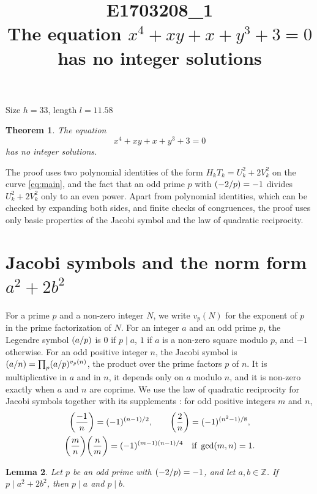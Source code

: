 \documentclass[11pt]{article}
\title{\textbf{E1703208\_1}\\[4pt] {\Large The equation $x^{4}+xy+x+y^{3}+3=0$ has no integer solutions}}
\author{}
\date{}
\newtheorem{theorem}{Theorem}
\newtheorem{lemma}[theorem]{Lemma}
\newcommand{\Z}{\mathbb{Z}}
\newcommand{\leg}[2]{\mathchoice{\biggl(\dfrac{#1}{#2}\biggr)}{(#1/#2)}{(#1/#2)}{(#1/#2)}}
\begin{document}
\maketitle
\vspace{-8ex}
\begin{center}
Size $h=33$, length $l=11.58$
\end{center}

\begin{theorem}\label{thm:main}
The equation
\begin{equation}\label{eq:main}
x^{4}+xy+x+y^{3}+3=0
\end{equation}
has no integer solutions.
\end{theorem}

The proof uses two polynomial identities of the form $H_kT_k=U_k^2+2V_k^2$ on the curve \eqref{eq:main}, and the fact that an odd prime $p$ with $\leg{-2}{p}=-1$ divides $U_k^2+2V_k^2$ only to an even power. Apart from polynomial identities, which can be checked by expanding both sides, and finite checks of congruences, the proof uses only basic properties of the Jacobi symbol and the law of quadratic reciprocity.

\section{\texorpdfstring{Jacobi symbols and the norm form $a^2+2b^2$}{Jacobi symbols and the norm form}}

For a prime $p$ and a non-zero integer $N$, we write $v_p(N)$ for the exponent of $p$ in the prime factorization of $N$. For an integer $a$ and an odd prime $p$, the Legendre symbol $\leg{a}{p}$ is $0$ if $p\mid a$, $1$ if $a$ is a non-zero square modulo $p$, and $-1$ otherwise. For an odd positive integer $n$, the Jacobi symbol is $\leg{a}{n}=\prod_p\leg{a}{p}^{v_p(n)}$, the product over the prime factors $p$ of $n$. It is multiplicative in $a$ and in $n$, it depends only on $a$ modulo $n$, and it is non-zero exactly when $a$ and $n$ are coprime. We use the law of quadratic reciprocity for Jacobi symbols together with its supplements \cite[Chapter~5, \S2]{IR}: for odd positive integers $m$ and $n$,
\begin{gather*}
\leg{-1}{n}=(-1)^{(n-1)/2},\qquad\leg{2}{n}=(-1)^{(n^2-1)/8},\\
\leg{m}{n}\leg{n}{m}=(-1)^{(m-1)(n-1)/4}\quad\text{if }\gcd(m,n)=1.
\end{gather*}

\begin{lemma}\label{lem:divides}
Let $p$ be an odd prime with $\leg{-2}{p}=-1$, and let $a,b\in\Z$. If $p\mid a^2+2b^2$, then $p\mid a$ and $p\mid b$.
\end{lemma}
\end{document}
